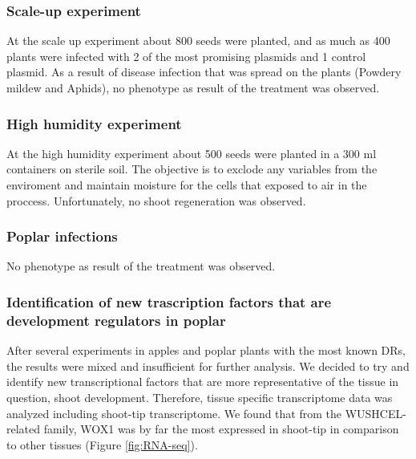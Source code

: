 \documentclass[
]{article}
\begin{document}
\hypertarget{scale-up-experiment-1}{%
\subsubsection{Scale-up experiment}\label{scale-up-experiment-1}}

At the scale up experiment about 800 seeds were planted, and as much as
400 plants were infected with 2 of the most promising plasmids and 1
control plasmid. As a result of disease infection that was spread on the
plants (Powdery mildew and Aphids), no phenotype as result of the
treatment was observed.

\hypertarget{high-humidity-experiment-1}{%
\subsubsection{High humidity
experiment}\label{high-humidity-experiment-1}}

At the high humidity experiment about 500 seeds were planted in a 300 ml
containers on sterile soil. The objective is to exclode any variables
from the enviroment and maintain moisture for the cells that exposed to
air in the proccess. Unfortunately, no shoot regeneration was observed.

\hypertarget{poplar-infections-1}{%
\subsubsection{Poplar infections}\label{poplar-infections-1}}

No phenotype as result of the treatment was observed.

\hypertarget{identification-of-new-trascription-factors-that-are-development-regulators-in-poplar}{%
\subsubsection{Identification of new trascription factors that are
development regulators in
poplar}\label{identification-of-new-trascription-factors-that-are-development-regulators-in-poplar}}

After several experiments in apples and poplar plants with the most
known DRs, the results were mixed and insufficient for further analysis.
We decided to try and identify new transcriptional factors that are more
representative of the tissue in question, shoot development. Therefore,
tissue specific transcriptome data was analyzed including shoot-tip
transcriptome. We found that from the WUSHCEL-related family, WOX1 was
by far the most expressed in shoot-tip in comparison to other tissues
(Figure \ref{fig:RNA-seq}).
\end{document}
